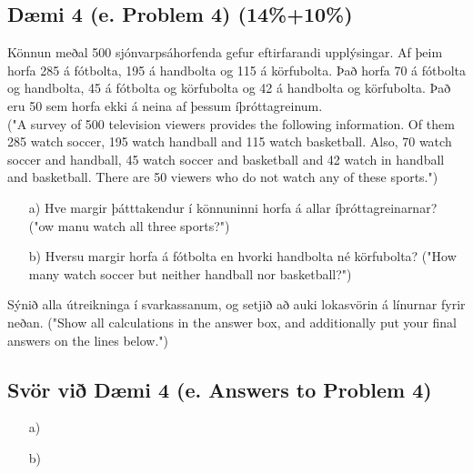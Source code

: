 \newpage
\subsection*{Dæmi 4 (e. Problem 4) (14\%+10\%) \label{section:daemi4}}
Könnun meðal 500 sjónvarpsáhorfenda gefur eftirfarandi upplýsingar. Af þeim horfa 285 á fótbolta, 195 á handbolta og 115 á körfubolta. Það horfa 70 á fótbolta og handbolta, 45 á fótbolta og körfubolta og 42 á handbolta og körfubolta. Það eru 50 sem horfa ekki á neina af þessum íþróttagreinum. \\
("A survey of 500 television viewers provides the following information. Of them 285 watch soccer, 195 watch handball and 115 watch basketball. Also, 70 watch soccer and handball, 45 watch soccer and basketball and 42 watch in handball and basketball. There are 50 viewers who do not watch any of these sports.")
\begin{itemize}
    \item[a)] Hve margir þátttakendur í könnuninni horfa á allar íþróttagreinarnar? ("ow manu watch all three sports?")
    \item[b)] Hversu margir horfa á fótbolta en hvorki handbolta né körfubolta? ("How many watch soccer but neither handball nor basketball?")
\end{itemize}
Sýnið alla útreikninga í svarkassanum, og setjið að auki lokasvörin á línurnar fyrir neðan. ("Show all calculations in the answer box, and additionally put your final answers on the lines below.")

\subsection*{Svör við Dæmi 4 (e. Answers to Problem 4)}

\newcommand{\makeAnswerBoxProblemFour}{
  \noindent
  \begin{tcolorbox}[colframe=black, colback=white, boxrule=0.5pt, arc=0pt, outer arc=0pt, height=\dimexpr\textheight-\ht\strutbox-25\baselineskip\relax]

    
  \end{tcolorbox}
}

\makeAnswerBoxProblemFour 

\vspace{5mm}

\begin{multicols}{2}
\begin{itemize}
    \item [a)] \fillin[7cm]{
  
    }     
    \newline
    \item [b)] \fillin[7cm]{
  
    } 
    \newline   
\end{itemize}
\end{multicols}